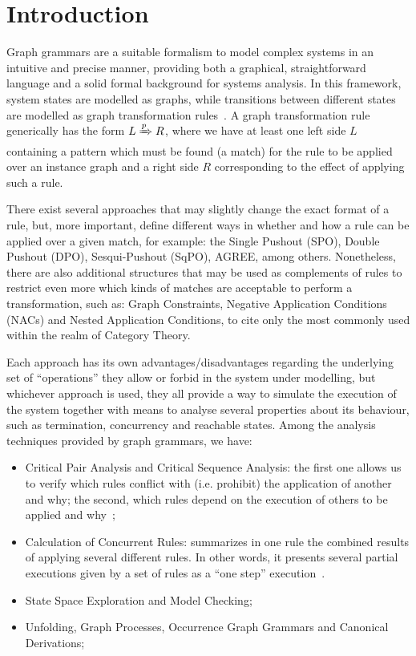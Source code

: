 \chapter{Introduction}

Graph grammars are a suitable formalism to model complex systems in an intuitive and precise manner, providing both a graphical, straightforward language and a solid formal background for systems analysis. In this framework, system states are modelled as graphs, while transitions between different states are modelled as graph transformation rules~\cite{Ehrig2006}. A graph transformation rule generically has the form $L \xRightarrow{p} R$, where we have at least one left side $L$ containing a pattern which must be found (a match) for the rule to be applied over an instance graph and a right side $R$ corresponding to the effect of applying such a rule.

There exist several approaches that may slightly change the exact format of a rule, but, more important, define different ways in whether and how a rule can be applied over a given match, for example: the Single Pushout (SPO), Double Pushout (DPO), Sesqui-Pushout (SqPO), AGREE, among others. Nonetheless, there are also additional structures that may be used as complements of rules to restrict even more which kinds of matches are acceptable to perform a transformation, such as: Graph Constraints, Negative Application Conditions (NACs) and Nested Application Conditions, to cite only the most commonly used within the realm of Category Theory.

Each approach has its own advantages/disadvantages regarding the underlying set of  ``operations'' they allow or forbid in the system under modelling, but whichever approach is used, they all provide a way to simulate the execution of the system together with means to analyse several properties about its behaviour, such as termination, concurrency and reachable states. Among the analysis techniques provided by graph grammars, we have:

\begin{itemize}
  \item Critical Pair Analysis and Critical Sequence Analysis: the first one allows us to verify which rules conflict with (i.e. prohibit) the application of another and why; the second, which rules depend on the execution of others to be applied and why~\cite{Lambers2008a};
  \item Calculation of Concurrent Rules: summarizes in one rule the combined results of applying several different rules. In other words, it presents several partial executions given by a set of rules as a ``one step'' execution~\cite{Lambers2008,BezerraETMF2016}.
  \item State Space Exploration and Model Checking; ~\cite{Rensink2004}
  \item Unfolding, Graph Processes, Occurrence Graph Grammars and Canonical Derivations; ~\cite{Corradini1996,Ribeiro1996}
\end{itemize}


